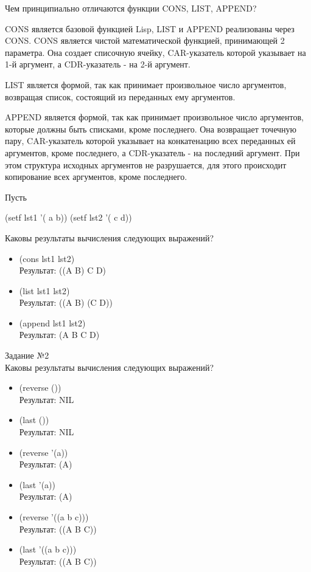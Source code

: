 Чем принципиально отличаются функции CONS, LIST, APPEND?

CONS является базовой функцией Lisp, LIST и APPEND реализованы через CONS. CONS является чистой математической функцией, принимающей 2 параметра. Она создает списочную ячейку, CAR-указатель которой указывает на 1-й аргумент, а CDR-указатель - на 2-й аргумент.

LIST является формой, так как принимает произвольное число аргументов, возвращая список, состоящий из переданных ему аргументов.

APPEND является формой, так как принимает произвольное число аргументов, которые должны быть списками, кроме последнего. Она возвращает точечную пару, CAR-указатель которой указывает на конкатенацию всех переданных ей аргументов, кроме последнего, а CDR-указатель - на последний аргумент. При этом структура исходных аргументов не разрушается, для этого происходит копирование всех аргументов, кроме последнего. 

Пусть

(setf lst1 '( a b)) (setf lst2 '( c d))

Каковы результаты вычисления следующих выражений?
\begin{itemize}
\item (cons lst1 lst2)\\
Результат: ((A B) C D)
\item (list lst1 lst2)\\
Результат: ((A B) (C D))
\item (append lst1 lst2)\\
Результат: (A B C D)\\
\end{itemize}

\newpage
\vspace*{10mm}

{\LARGE Задание №2}\\

Каковы результаты вычисления следующих выражений?
\begin{itemize}
\item (reverse ())\\
Результат: NIL
\item (last ())\\
Результат: NIL
\item (reverse '(a))\\
Результат: (A)
\item (last '(a))\\
Результат: (A)
\item (reverse '((a b c)))\\
Результат: ((A B C))
\item (last '((a b c)))\\
Результат: ((A B C))\\
\end{itemize}


